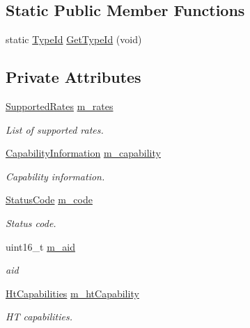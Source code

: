 \subsection*{Static Public Member Functions}
\begin{DoxyCompactItemize}
\item 
static \hyperlink{classns3_1_1TypeId}{Type\+Id} \hyperlink{classns3_1_1MgtAssocResponseHeader_ac3b861332ae9d0759999354461f0b808}{Get\+Type\+Id} (void)
\end{DoxyCompactItemize}
\subsection*{Private Attributes}
\begin{DoxyCompactItemize}
\item 
\hyperlink{classns3_1_1SupportedRates}{Supported\+Rates} \hyperlink{classns3_1_1MgtAssocResponseHeader_a49cb0162ba9a28777aa753fd1ba71193}{m\+\_\+rates}
\begin{DoxyCompactList}\small\item\em List of supported rates. \end{DoxyCompactList}\item 
\hyperlink{classns3_1_1CapabilityInformation}{Capability\+Information} \hyperlink{classns3_1_1MgtAssocResponseHeader_a785f2468beb110300bcdda8b4a168bce}{m\+\_\+capability}
\begin{DoxyCompactList}\small\item\em Capability information. \end{DoxyCompactList}\item 
\hyperlink{classns3_1_1StatusCode}{Status\+Code} \hyperlink{classns3_1_1MgtAssocResponseHeader_affb9552fb07209f8312048615ba08a32}{m\+\_\+code}
\begin{DoxyCompactList}\small\item\em Status code. \end{DoxyCompactList}\item 
uint16\+\_\+t \hyperlink{classns3_1_1MgtAssocResponseHeader_abc46e106fb706b35ed61adbd099306f8}{m\+\_\+aid}
\begin{DoxyCompactList}\small\item\em aid \end{DoxyCompactList}\item 
\hyperlink{classns3_1_1HtCapabilities}{Ht\+Capabilities} \hyperlink{classns3_1_1MgtAssocResponseHeader_aa2ebab65687bbc0ea342d6a55236cb87}{m\+\_\+ht\+Capability}
\begin{DoxyCompactList}\small\item\em HT capabilities. \end{DoxyCompactList}\item 

\end{DoxyCompactItemize}
